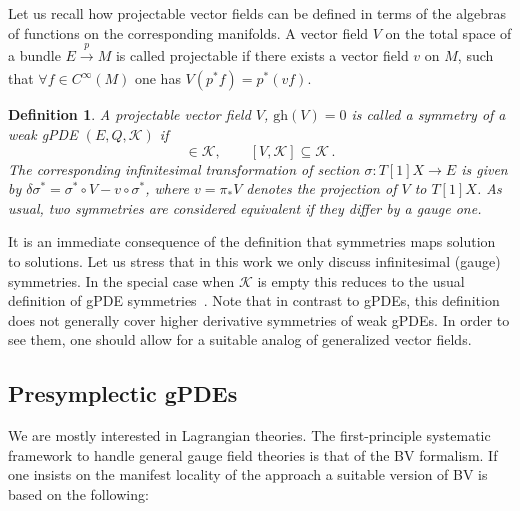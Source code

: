 \documentclass[a4paper,12pt]{article}
\newcommand{\maxim}[1]{\textsc{#1}}
\numberwithin{equation}{section} %
\newtheorem{definition}[thm]{Definition}
\newcommand{\gh}[1]{\mathrm{gh}(#1)}
\renewcommand{\d}{\partial}
\newcommand{\ffrac}[2]{\raisebox{.5pt}%
  {\footnotesize$\displaystyle\frac{#1}{#2}$}\kern1pt}
\newcommand{\ddl}[2]{\ffrac{\d #1}{\d #2}}
\def\cK{\mathcal{K}}
\newcommand{\comm}[1]{}
\begin{document}
Let us recall how projectable vector fields can be defined in terms of the algebras of functions on the corresponding manifolds. A vector field $V$ on the total space of a bundle $E \xrightarrow[]{p} M$ is called projectable if there exists a vector field $v$ on $M$, such that $\forall f \in C^\infty(M)$ one has $V (p^* f) = p^* (vf)$.

\begin{definition}
    A projectable vector field $V$, $\gh{V} = 0$ is called a symmetry of a weak gPDE $(E,Q,\cK)$ if
    \begin{equation}
        [V,Q] \in \cK, \qquad [V,\cK] \subseteq \cK\,.
    \end{equation}
    The corresponding infinitesimal transformation of section $\sigma:T[1]X\to E$ is given by
    $\delta \sigma^*=\sigma^* \circ V - v\circ \sigma^*$, where $v=\pi_*V$ denotes the projection of $V$ to $T[1]X$. As usual, two symmetries are considered equivalent if they differ by a gauge one. 
\end{definition}
It is an immediate consequence of the definition that symmetries maps solution to solutions. Let us stress that in this work we only discuss infinitesimal (gauge) symmetries.  In the special case when $\cK$ is empty this reduces to the usual definition of gPDE symmetries~\cite{Grigoriev:2019ojp,Grigoriev:2023kkk}. \comm{\footnote{\maxim{Note that in the case of gPDEs any symmetry can be made vertical by adding a suitable gauge symmetry. This is generally not the case when we consider weak gPDEs, because vector fields generating gauge transformations have to preserve $\cK$. Generally, the vector field $\ddl{}{\theta^a}$ does not preserve $\cK$.}}} Note that in contrast to gPDEs, this definition does not generally cover higher derivative symmetries of weak gPDEs. In order to see them, one should allow for a suitable analog of generalized vector fields. 


\subsection{Presymplectic gPDEs}\label{sec:presymplectic}
We are mostly interested in Lagrangian theories. The first-principle systematic framework to handle general gauge field theories is that of the BV formalism. If one insists on the manifest locality of the approach a suitable version of BV is based on the following:
\end{document}
